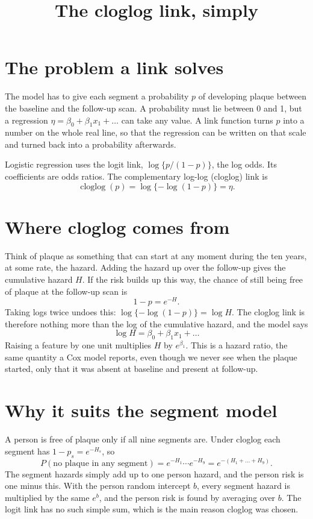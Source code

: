 \documentclass[11pt]{article}
\title{The cloglog link, simply}
\date{}
\begin{document}
\maketitle

\section*{The problem a link solves}

The model has to give each segment a probability $p$ of developing plaque
between the baseline and the follow-up scan. A probability must lie between
0 and 1, but a regression $\eta = \beta_0 + \beta_1 x_1 + \dots$ can take any
value. A link function turns $p$ into a number on the whole real line, so
that the regression can be written on that scale and turned back into a
probability afterwards.

Logistic regression uses the logit link, $\log\{p/(1-p)\}$, the log odds.
Its coefficients are odds ratios. The complementary log-log (cloglog) link is
\[
  \operatorname{cloglog}(p) = \log\{-\log(1-p)\} = \eta .
\]

\section*{Where cloglog comes from}

Think of plaque as something that can start at any moment during the ten
years, at some rate, the hazard. Adding the hazard up over the follow-up
gives the cumulative hazard $H$. If the risk builds up this way, the chance
of still being free of plaque at the follow-up scan is
\[
  1 - p = e^{-H}.
\]
Taking logs twice undoes this: $\log\{-\log(1-p)\} = \log H$. The cloglog
link is therefore nothing more than the log of the cumulative hazard, and the
model says
\[
  \log H = \beta_0 + \beta_1 x_1 + \dots
\]
Raising a feature by one unit multiplies $H$ by $e^{\beta_1}$. This is a
hazard ratio, the same quantity a Cox model reports, even though we never see
when the plaque started, only that it was absent at baseline and present at
follow-up.

\section*{Why it suits the segment model}

A person is free of plaque only if all nine segments are. Under cloglog
each segment has $1-p_s = e^{-H_s}$, so
\[
  P(\text{no plaque in any segment}) = e^{-H_1}\cdots e^{-H_9}
  = e^{-(H_1+\dots+H_9)} .
\]
The segment hazards simply add up to one person hazard, and the person risk
is one minus this. With the person random intercept $b$, every segment hazard
is multiplied by the same $e^{b}$, and the person risk is found by averaging
over $b$. The logit link has no such simple sum, which is the main reason
cloglog was chosen.
\end{document}
